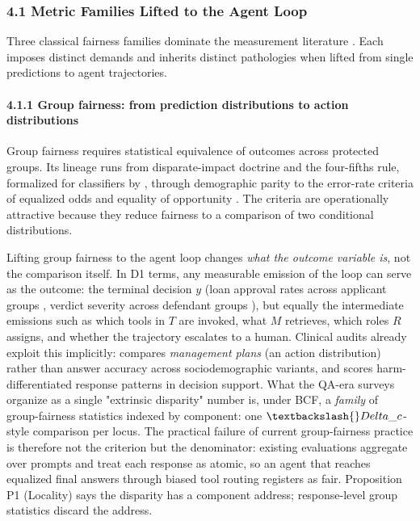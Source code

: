 \documentclass[10pt]{article}
\begin{document}
\subsubsection*{4.1 Metric Families Lifted to the Agent Loop}

Three classical fairness families dominate the measurement literature \cite{mehrabi2021survey,caton2024fairness,pessach2022review,barocas2023fairness}. Each imposes distinct demands and inherits distinct pathologies when lifted from single predictions to agent trajectories.

\paragraph*{4.1.1 Group fairness: from prediction distributions to action distributions}

Group fairness requires statistical equivalence of outcomes across protected groups. Its lineage runs from disparate-impact doctrine and the four-fifths rule, formalized for classifiers by \cite{feldman2015certifying}, through demographic parity to the error-rate criteria of equalized odds and equality of opportunity \cite{hardt2016equality}. The criteria are operationally attractive because they reduce fairness to a comparison of two conditional distributions.

Lifting group fairness to the agent loop changes \emph{what the outcome variable is}, not the comparison itself. In D1 terms, any measurable emission of the loop can serve as the outcome: the terminal decision $y$ (loan approval rates across applicant groups \cite{azime2025accept}, verdict severity across defendant groups \cite{hu2025llms}), but equally the intermediate emissions such as which tools in $T$ are invoked, what $M$ retrieves, which roles $R$ assigns, and whether the trajectory escalates to a human. Clinical audits already exploit this implicitly: \cite{omar2025sociodemographic} compares \emph{management plans} (an action distribution) rather than answer accuracy across sociodemographic variants, and \cite{adappanavar2025mfarm} scores harm-differentiated response patterns in decision support. What the QA-era surveys organize as a single "extrinsic disparity" number \cite{gallegos2024bias,chu2024fairness} is, under BCF, a \emph{family} of group-fairness statistics indexed by component: one $\textbackslash\{\}Delta\_c$-style comparison per locus. The practical failure of current group-fairness practice is therefore not the criterion but the denominator: existing evaluations aggregate over prompts and treat each response as atomic, so an agent that reaches equalized final answers through biased tool routing registers as fair. Proposition P1 (Locality) says the disparity has a component address; response-level group statistics discard the address.
\end{document}
